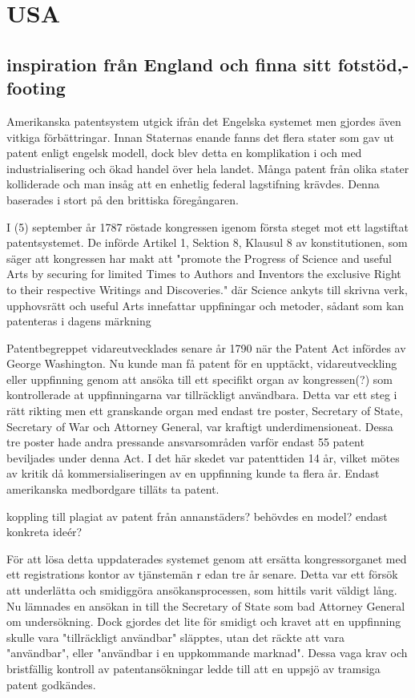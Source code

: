 \section{USA} %

\subsection{inspiration från England och finna sitt fotstöd,- footing} %
\label{sub:inspiration_från_england}

Amerikanska patentsystem utgick ifrån det Engelska systemet men gjordes även vitkiga förbättringar. Innan
Staternas enande fanns det flera stater som gav ut patent enligt engelsk modell, dock blev detta en
komplikation i och med industrialisering och ökad handel över hela landet. Många patent från olika stater
kolliderade och man insåg att en enhetlig federal lagstifning krävdes. Denna baserades i stort på den
brittiska föregångaren.

I (5) september år 1787 röstade kongressen igenom första steget mot ett lagstiftat patentsystemet. De
införde Artikel 1, Sektion 8, Klausul 8 av konstitutionen, som säger att kongressen har makt att "promote
the Progress of Science and useful Arts by securing for limited Times to Authors and Inventors the
exclusive Right to their respective Writings and Discoveries." där Science ankyts till skrivna verk,
upphovsrätt och useful Arts innefattar uppfiningar och metoder, sådant som kan patenteras i dagens märkning

Patentbegreppet vidareutvecklades senare år 1790 när the Patent Act infördes av George Washington. Nu kunde
man få patent för en upptäckt, vidareutveckling eller uppfinning genom att ansöka till ett specifikt organ
av kongressen(?) som kontrollerade at uppfinningarna var tillräckligt användbara. Detta var ett steg i rätt
rikting men ett granskande organ med endast tre poster, Secretary of State, Secretary of War och Attorney
General, var kraftigt underdimensioneat. Dessa tre poster hade andra pressande ansvarsområden varför endast
55 patent beviljades under denna Act. I det här skedet var patenttiden 14 år, vilket mötes av kritik då
kommersialiseringen av en uppfinning kunde ta flera år. Endast amerikanska medbordgare tilläts ta patent.

koppling till plagiat av patent från annanstäders?
behövdes en model? endast konkreta ideér?

För att lösa detta uppdaterades systemet genom att ersätta kongressorganet med ett registrations kontor av
tjänstemän r edan tre år senare. Detta var ett försök att underlätta och smidiggöra ansökansprocessen, som
hittils varit väldigt lång. Nu lämnades en ansökan in till the Secretary of State som bad Attorney General
om undersökning. Dock gjordes det lite för smidigt och kravet att en uppfinning skulle vara "tillräckligt
användbar" släpptes, utan det räckte att vara "användbar", eller "användbar i en uppkommande marknad".
Dessa vaga krav och bristfällig kontroll av patentansökningar ledde till att en uppsjö av tramsiga patent
godkändes.

